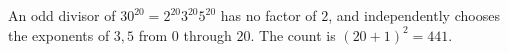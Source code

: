 An odd divisor of $30^{20}=2^{20}3^{20}5^{20}$ has no factor of $2$, and independently chooses the exponents of $3,5$ from $0$ through $20$. The count is $(20+1)^2=\boxed{441}$.
